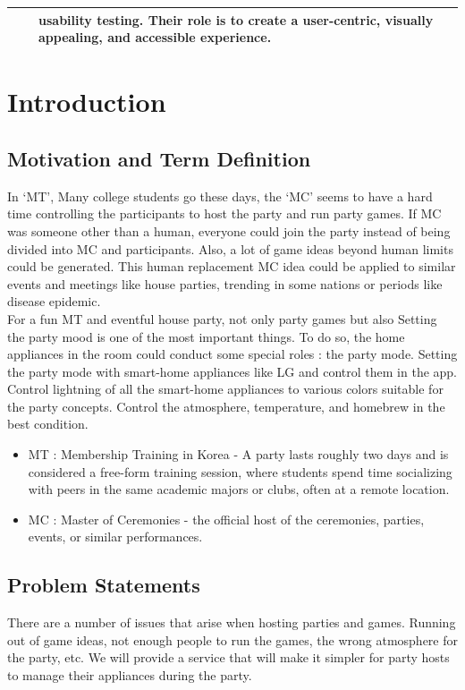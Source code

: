 \documentclass[conference]{IEEEtran}
\begin{document}
\begin{table}[htbp]
     \begin{tabular}{|p{1cm}|p{1.7cm}|p{5cm}|}
     \hline
     & &
    usability testing. Their role is to create a user-centric, visually appealing, and accessible experience.\\
     \hline
\end{tabular}
\end{table}

\section{Introduction}

    \subsection{Motivation and Term Definition}
        In ‘MT’,  Many college students go these days, the ‘MC’ seems to have a hard time controlling the participants to host the party and run party games. If MC was someone other than a human, everyone could join the party instead of being divided into MC and participants. Also, a lot of game ideas beyond human limits could be generated. This human replacement MC idea could be applied to similar events and meetings like house parties, trending in some nations or periods like disease epidemic.\\
    	For a fun MT and eventful house party, not only party games but also Setting the party mood is one of the most important things. To do so, the home appliances in the room could conduct some special roles : the party mode. Setting the party mode with  smart-home appliances like LG and control them in the app. Control lightning of all the smart-home appliances to various colors suitable for the party concepts. Control the atmosphere, temperature, and homebrew in the best condition.
        \begin{itemize}
            \item MT :  Membership Training in Korea - A party lasts roughly two days and is considered a free-form training session, where students spend time socializing with peers in the same academic majors or clubs, often at a remote location.
            \item MC : Master of Ceremonies - the official host of the ceremonies, parties, events, or similar performances.
        \end{itemize}

    \subsection{Problem Statements}
        There are a number of issues that arise when hosting parties and games. Running out of game ideas, not enough people to run the games, the wrong atmosphere for the party, etc. We will provide a service that will make it simpler for party hosts to manage their appliances during the party.
\end{document}
